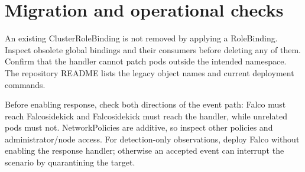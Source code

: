 \section{Migration and operational checks}
An existing ClusterRoleBinding is not removed by applying a RoleBinding. Inspect
obsolete global bindings and their consumers before deleting any of them. Confirm
that the handler cannot patch pods outside the intended namespace. The repository
README lists the legacy object names and current deployment commands.

Before enabling response, check both directions of the event path: Falco must reach
Falcosidekick and Falcosidekick must reach the handler, while unrelated pods must not.
NetworkPolicies are additive, so inspect other policies and administrator/node access.
For detection-only observations, deploy Falco without enabling the response handler;
otherwise an accepted event can interrupt the scenario by quarantining the target.
